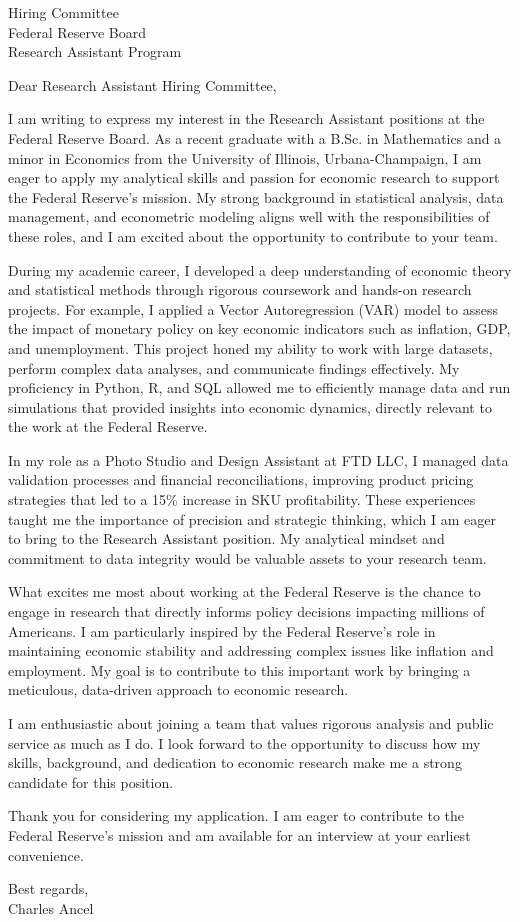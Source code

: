 \documentclass{letter}
\begin{document}
\begin{letter}{Hiring Committee\\Federal Reserve Board\\Research Assistant Program}

    
\opening{ Dear Research Assistant Hiring Committee, }

I am writing to express my interest in the Research Assistant positions at the Federal Reserve Board. As a recent graduate with a B.Sc. in Mathematics and a minor in Economics from the University of Illinois, Urbana-Champaign, I am eager to apply my analytical skills and passion for economic research to support the Federal Reserve's mission. My strong background in statistical analysis, data management, and econometric modeling aligns well with the responsibilities of these roles, and I am excited about the opportunity to contribute to your team.

During my academic career, I developed a deep understanding of economic theory and statistical methods through rigorous coursework and hands-on research projects. For example, I applied a Vector Autoregression (VAR) model to assess the impact of monetary policy on key economic indicators such as inflation, GDP, and unemployment. This project honed my ability to work with large datasets, perform complex data analyses, and communicate findings effectively. My proficiency in Python, R, and SQL allowed me to efficiently manage data and run simulations that provided insights into economic dynamics, directly relevant to the work at the Federal Reserve.

In my role as a Photo Studio and Design Assistant at FTD LLC, I managed data validation processes and financial reconciliations, improving product pricing strategies that led to a 15\% increase in SKU profitability. These experiences taught me the importance of precision and strategic thinking, which I am eager to bring to the Research Assistant position. My analytical mindset and commitment to data integrity would be valuable assets to your research team.

What excites me most about working at the Federal Reserve is the chance to engage in research that directly informs policy decisions impacting millions of Americans. I am particularly inspired by the Federal Reserve's role in maintaining economic stability and addressing complex issues like inflation and employment. My goal is to contribute to this important work by bringing a meticulous, data-driven approach to economic research.

I am enthusiastic about joining a team that values rigorous analysis and public service as much as I do. I look forward to the opportunity to discuss how my skills, background, and dedication to economic research make me a strong candidate for this position.

Thank you for considering my application. I am eager to contribute to the Federal Reserve's mission and am available for an interview at your earliest convenience.

\begin{flushleft}
Best regards,\\
Charles Ancel
\end{flushleft}

\end{letter}
\end{document}
